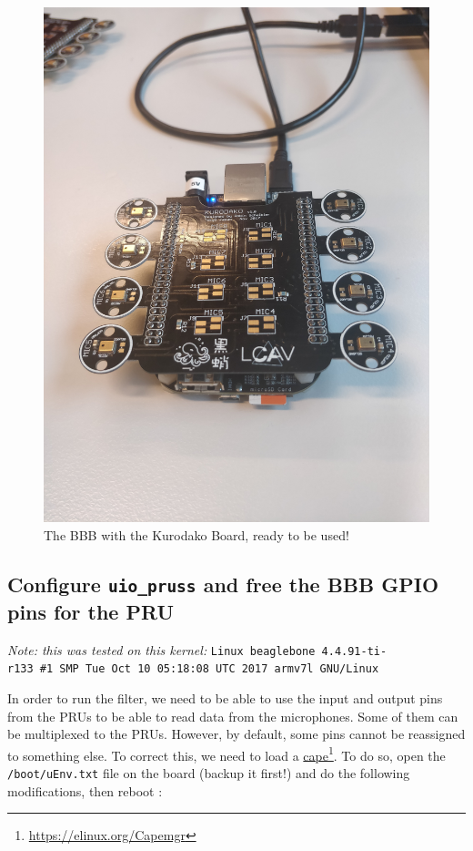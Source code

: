 \documentclass[]{report}
\begin{document}
\begin{figure}
\centering
\includegraphics[width=0.4\linewidth]{Pictures/BBBkurodako.jpg}
\caption{The BBB with the Kurodako Board, ready to be used!}
\end{figure}


\hypertarget{configure-uio-pruss-and-free-the-gpio-pins-for-the-pru}{%
	\subsection{\texorpdfstring{Configure \texttt{uio\_pruss} and free
			the BBB GPIO pins for the
			PRU}{Configure uio\textunderscore pruss and free the BBB GPIO pins for the PRU}}\label{configure-uio-pruss-and-free-the-gpio-pins-for-the-pru}}

\emph{Note: this was tested on this kernel:}
\texttt{Linux beaglebone\ 4.4.91-ti-r133\ \#1\ SMP\ Tue\ Oct\ 10\ 05:18:08\ UTC\ 2017\ armv7l\ GNU/Linux}

In order to run the filter, we need to be able to use the input and
output pins from the PRUs to be able to read data from the microphones.
Some of them can be multiplexed to the PRUs. However, by default, some
pins cannot be reassigned to something else. To correct this, we need to
load a \href{https://elinux.org/Capemgr}{cape}\footnote{\url{https://elinux.org/Capemgr}}. To do so, open the
\texttt{/boot/uEnv.txt} file on the board (backup it first!) and do the
following modifications, then reboot :\\
\end{document}
